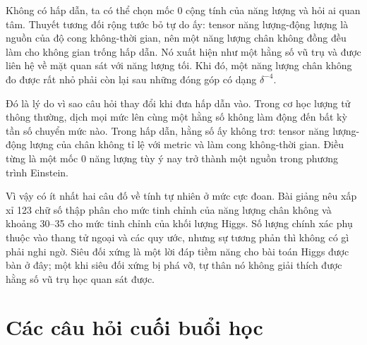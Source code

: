 Không có hấp dẫn, ta có thể chọn mốc 0 cộng tính của năng lượng và hỏi ai quan tâm. Thuyết tương đối rộng tước bỏ tự do ấy: tensor năng lượng-động lượng là nguồn của độ cong không-thời gian, nên một năng lượng chân không đồng đều làm cho không gian trống hấp dẫn. Nó xuất hiện như một hằng số vũ trụ và được liên hệ về mặt quan sát với năng lượng tối. Khi đó, một năng lượng chân không đo được rất nhỏ phải còn lại sau những đóng góp có dạng \(\delta^{-4}\).

Đó là lý do vì sao câu hỏi thay đổi khi đưa hấp dẫn vào. Trong cơ học lượng tử thông thường, dịch mọi mức lên cùng một hằng số không làm động đến bất kỳ tần số chuyển mức nào. Trong hấp dẫn, hằng số ấy không trơ: tensor năng lượng-động lượng của chân không tỉ lệ với metric và làm cong không-thời gian. Điều từng là một mốc 0 năng lượng tùy ý nay trở thành một nguồn trong phương trình Einstein.

Vì vậy có ít nhất hai câu đố về tính tự nhiên ở mức cực đoan. Bài giảng nêu xấp xỉ 123 chữ số thập phân cho mức tinh chỉnh của năng lượng chân không và khoảng 30--35 cho mức tinh chỉnh của khối lượng Higgs. Số lượng chính xác phụ thuộc vào thang tử ngoại và các quy ước, nhưng sự tương phản thì không có gì phải nghi ngờ. Siêu đối xứng là một lời đáp tiềm năng cho bài toán Higgs được bàn ở đây; một khi siêu đối xứng bị phá vỡ, tự thân nó không giải thích được hằng số vũ trụ học quan sát được.

\section{Các câu hỏi cuối buổi học}

\begin{classroomqa}
\end{classroomqa}

